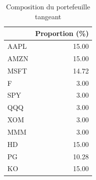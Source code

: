 \documentclass[
]{article}
\begin{document}
\begin{table}

\caption{\label{tab:unnamed-chunk-22}Composition du portefeuille tangeant}
\centering
\begin{tabular}[t]{lr}
\toprule
  & Proportion (\%)\\
\midrule
AAPL & 15.00\\
AMZN & 15.00\\
MSFT & 14.72\\
F & 3.00\\
SPY & 3.00\\
\addlinespace
QQQ & 3.00\\
XOM & 3.00\\
MMM & 3.00\\
HD & 15.00\\
PG & 10.28\\
\addlinespace
KO & 15.00\\
\bottomrule
\end{tabular}
\end{table}
\end{document}
